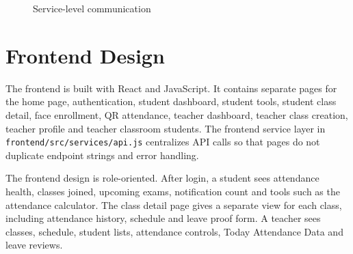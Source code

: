 \begin{figure}[H]
\centering
{}
\caption{Service-level communication}
\label{fig:service-communication}
\end{figure}

\section{Frontend Design}

The frontend is built with React and JavaScript. It contains separate pages for the home page, authentication, student dashboard, student tools, student class detail, face enrollment, QR attendance, teacher dashboard, teacher class creation, teacher profile and teacher classroom students. The frontend service layer in \texttt{frontend/src/services/api.js} centralizes API calls so that pages do not duplicate endpoint strings and error handling.

The frontend design is role-oriented. After login, a student sees attendance health, classes joined, upcoming exams, notification count and tools such as the attendance calculator. The class detail page gives a separate view for each class, including attendance history, schedule and leave proof form. A teacher sees classes, schedule, student lists, attendance controls, Today Attendance Data and leave reviews.

